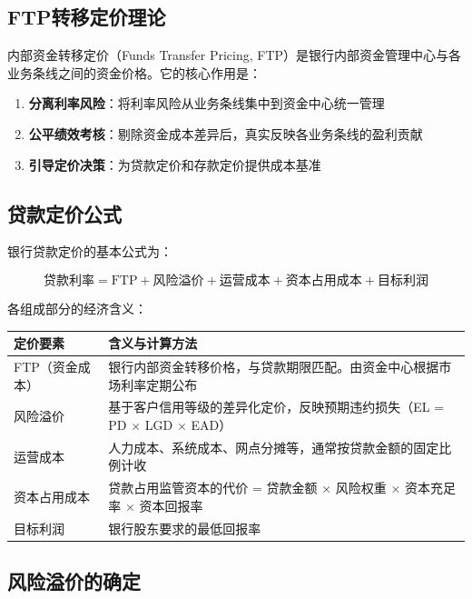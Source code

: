 \subsection{FTP转移定价理论}

内部资金转移定价（Funds Transfer Pricing, FTP）是银行内部资金管理中心与各业务条线之间的资金价格。它的核心作用是：

\begin{enumerate}[leftmargin=2em]
  \item \textbf{分离利率风险}：将利率风险从业务条线集中到资金中心统一管理
  \item \textbf{公平绩效考核}：剔除资金成本差异后，真实反映各业务条线的盈利贡献
  \item \textbf{引导定价决策}：为贷款定价和存款定价提供成本基准
\end{enumerate}

\subsection{贷款定价公式}

银行贷款定价的基本公式为：

\[
\text{贷款利率} = \text{FTP} + \text{风险溢价} + \text{运营成本} + \text{资本占用成本} + \text{目标利润}
\]

各组成部分的经济含义：

\begin{table}[H]
\centering
\begin{tabular}{lp{9cm}}
\toprule
\textbf{定价要素} & \textbf{含义与计算方法} \\
\midrule
FTP（资金成本） & 银行内部资金转移价格，与贷款期限匹配。由资金中心根据市场利率定期公布 \\
风险溢价 & 基于客户信用等级的差异化定价，反映预期违约损失（EL = PD $\times$ LGD $\times$ EAD） \\
运营成本 & 人力成本、系统成本、网点分摊等，通常按贷款金额的固定比例计收 \\
资本占用成本 & 贷款占用监管资本的代价 = 贷款金额 $\times$ 风险权重 $\times$ 资本充足率 $\times$ 资本回报率 \\
目标利润 & 银行股东要求的最低回报率 \\
\bottomrule
\end{tabular}
\end{table}

\subsection{风险溢价的确定}

